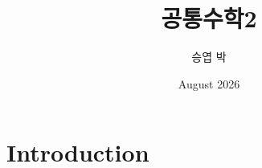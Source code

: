 \documentclass{article}
\title{공통수학2}
\author{승엽 박}
\date{August 2026}
\begin{document}
\maketitle

\section{Introduction}
\end{document}
